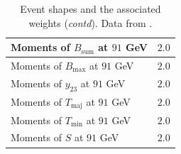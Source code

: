 \documentclass[aps,preprint,floatfix,nofootinbib,showpacs]{revtex4-1}
\begin{document}
\begin{table}[tbp]
\begin{center}
\begin{tabular}{l | l}
Moments of $B_\text{sum}$ at $91$ GeV                          & \hspace{1cm} $2.0$ \\ \hline
Moments of $B_\text{max}$ at $91$ GeV                          & \hspace{1cm} $2.0$ \\ \hline
Moments of $y_{23}$ at $91$ GeV                                & \hspace{1cm} $2.0$ \\ \hline
Moments of $T_\text{maj}$ at $91$ GeV                          & \hspace{1cm} $2.0$ \\ \hline
Moments of $T_\text{min}$ at $91$ GeV                          & \hspace{1cm} $2.0$ \\ \hline
Moments of $S$ at $91$ GeV                                     & \hspace{1cm} $2.0$ \\ \hline \hline    
   \end{tabular}
  \end{center}
\caption{Event shapes and the associated weights (\emph{contd}). Data from 
\cite{Decamp:1991uz, Barate:1996fi, Heister:2003aj, Abreu:1996na, Achard:2004sv, Abbiendi:2004qz}. }
\label{Tab5}
 \end{table}
 
\end{document}
